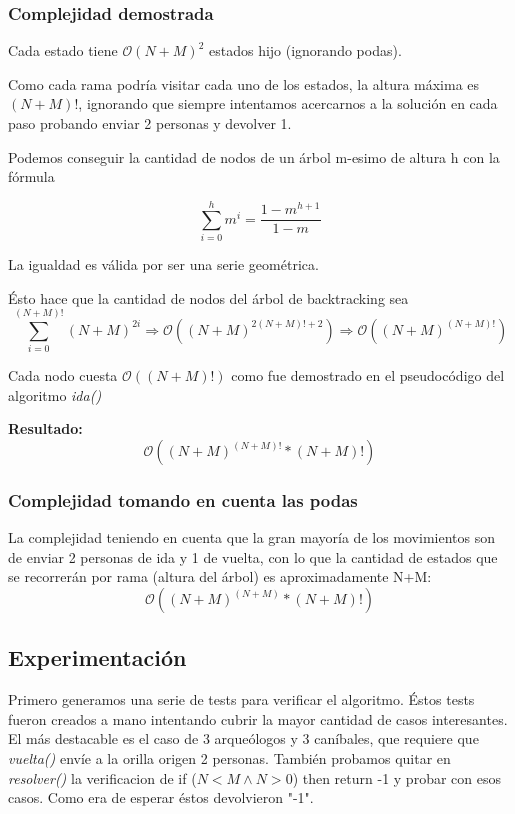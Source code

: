 \subsubsection{Complejidad demostrada}
Cada estado tiene $\mathcal{O}{(N+M)}^2$ estados hijo (ignorando podas).

Como cada rama podr\'ia visitar cada uno de los estados, la altura máxima es $(N+M)!$, ignorando que siempre intentamos acercarnos a la solución en cada paso probando enviar 2 personas y devolver 1.

Podemos conseguir la cantidad de nodos de un árbol m-esimo de altura h con la fórmula

\[
\sum_{i=0}^{h}{m}^{i} = \frac{1 - m^{h+1}}{1 - m}
\]

La igualdad es válida por ser una serie geométrica.

Ésto hace que la cantidad de nodos del árbol de backtracking sea 
\[
\sum_{i=0}^{(N+M)!}{(N+M)}^{2i} \Rightarrow \mathcal{O}({(N+M)}^{2(N+M)! +2 })\Rightarrow \mathcal{O}({(N+M)}^{(N+M)!})
\]

Cada nodo cuesta $\mathcal{O}((N+M)!)$ como fue demostrado en el pseudocódigo del algoritmo \textit{ida()}

\vspace*{5mm}
\textbf{Resultado:}
\[
\mathcal{O}({(N+M)}^{(N+M)!} * (N+M)!)
\]


\subsubsection{Complejidad tomando en cuenta las podas}
La complejidad teniendo en cuenta que la gran mayoría de los movimientos son de enviar 2 personas de ida y 1 de vuelta, con lo que la cantidad de estados que se recorrerán por rama (altura del árbol) es aproximadamente N+M: 
\[
\mathcal{O}({(N+M)}^{(N+M)} * (N+M)!)
\]

\subsection{Experimentación}

Primero generamos una serie de tests para verificar el algoritmo.
Éstos tests fueron creados a mano intentando cubrir la mayor cantidad de casos interesantes. El más destacable es el caso de 3 arqueólogos y 3 caníbales, que requiere que \textit{vuelta()} envíe a la orilla origen 2 personas. 
También probamos quitar en \textit{resolver()} la verificacion de if ($N < M \land N > 0$) then return -1 y probar con esos casos. Como era de esperar éstos devolvieron "-1".

